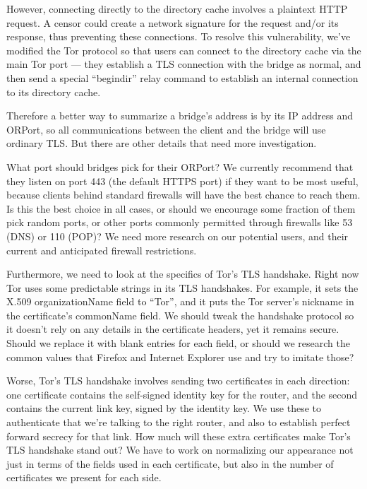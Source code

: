 \documentclass{llncs}
\begin{document}
However, connecting directly to the directory cache involves a plaintext
HTTP request. A censor could create a network signature for the request
and/or its response, thus preventing these connections. To resolve this
vulnerability, we've modified the Tor protocol so that users can connect
to the directory cache via the main Tor port --- they establish a TLS
connection with the bridge as normal, and then send a special ``begindir''
relay command to establish an internal connection to its directory cache.

Therefore a better way to summarize a bridge's address is by its IP
address and ORPort, so all communications between the client and the
bridge will use ordinary TLS. But there are other details that need
more investigation.

What port should bridges pick for their ORPort? We currently recommend
that they listen on port 443 (the default HTTPS port) if they want to
be most useful, because clients behind standard firewalls will have
the best chance to reach them. Is this the best choice in all cases,
or should we encourage some fraction of them pick random ports, or other
ports commonly permitted through firewalls like 53 (DNS) or 110
(POP)? We need
more research on our potential users, and their current and anticipated
firewall restrictions.

Furthermore, we need to look at the specifics of Tor's TLS handshake.
Right now Tor uses some predictable strings in its TLS handshakes. For
example, it sets the X.509 organizationName field to ``Tor'', and it puts
the Tor server's nickname in the certificate's commonName field. We
should tweak the handshake protocol so it doesn't rely on any details
in the certificate headers, yet it remains secure. Should we replace
it with blank entries for each field, or should we research the common
values that Firefox and Internet Explorer use and try to imitate those?

Worse, Tor's TLS handshake involves sending two certificates in each
direction: one certificate contains the self-signed identity key for
the router, and the second contains the current link key, signed by the
identity key. We use these to authenticate that we're talking to the right
router, and also to establish perfect forward secrecy for that link.
How much will these extra certificates make Tor's TLS handshake stand
out? We have to work on normalizing our appearance not just in terms
of the fields used in each certificate, but also in the number of
certificates we present for each side.
\end{document}
